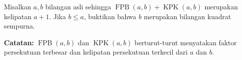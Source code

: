 Misalkan $a, b$ bilangan asli sehingga $\operatorname{FPB}(a, b)+\operatorname{KPK}(a, b)$ merupakan kelipatan $a+ 1$. Jika $b \le a$, buktikan bahwa $b$ merupakan bilangan kuadrat sempurna. 

\textbf{Catatan:} $\operatorname{FPB}(a, b)$ dan $\operatorname{KPK}(a, b)$ berturut-turut menyatakan faktor persekutuan terbesar dan kelipatan persekutuan terkecil dari $a$ dan $b$.